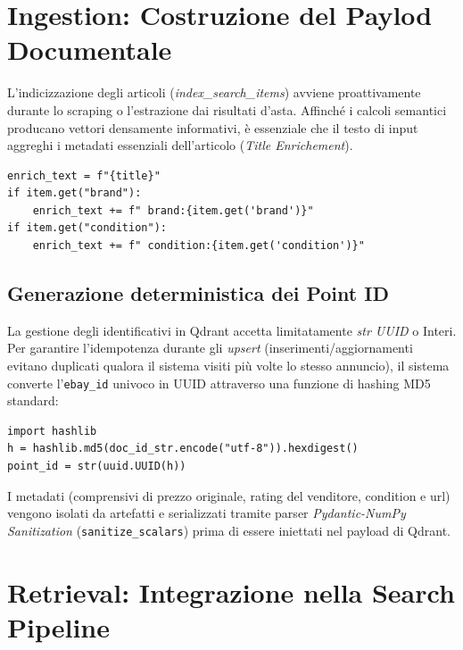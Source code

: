 \section{Ingestion: Costruzione del Paylod Documentale}
\label{sec:rag-ingestion}

L'indicizzazione degli articoli (\textit{index\_search\_items}) avviene proattivamente durante lo scraping o l'estrazione dai risultati d'asta. 
Affinché i calcoli semantici producano vettori densamente informativi, è essenziale che il testo di input aggreghi i metadati essenziali dell'articolo (\textit{Title Enrichement}).

\begin{verbatim}
enrich_text = f"{title}"
if item.get("brand"):
    enrich_text += f" brand:{item.get('brand')}"
if item.get("condition"):
    enrich_text += f" condition:{item.get('condition')}"
\end{verbatim}

\subsection{Generazione deterministica dei Point ID}
La gestione degli identificativi in Qdrant accetta limitatamente \textit{str UUID} o Interi. Per garantire l'idempotenza durante gli \textit{upsert} (inserimenti/aggiornamenti evitano duplicati qualora il sistema visiti più volte lo stesso annuncio), il sistema converte l'\texttt{ebay\_id} univoco in UUID attraverso una funzione di hashing MD5 standard:

\begin{verbatim}
import hashlib
h = hashlib.md5(doc_id_str.encode("utf-8")).hexdigest()
point_id = str(uuid.UUID(h))
\end{verbatim}

I metadati (comprensivi di prezzo originale, rating del venditore, condition e url) vengono isolati da artefatti e serializzati tramite parser \textit{Pydantic-NumPy Sanitization} (\texttt{sanitize\_scalars}) prima di essere iniettati nel payload di Qdrant.

\section{Retrieval: Integrazione nella Search Pipeline}
\label{sec:rag-pipeline}

